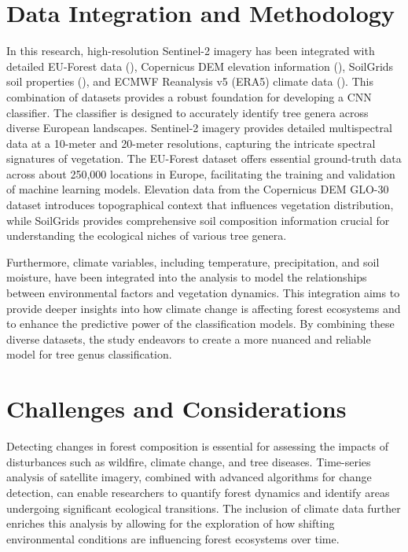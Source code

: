 \section{Data Integration and Methodology}

In this research, high-resolution Sentinel-2 imagery has been integrated with detailed EU-Forest data (\cite{eu_forest_data}), Copernicus DEM elevation information (\cite{dem_dataset}), SoilGrids soil properties (\cite{soil_report}), and ECMWF Reanalysis v5 (ERA5) climate data (\cite{era5_dataset}). This combination of datasets provides a robust foundation for developing a CNN classifier. The classifier is designed to accurately identify tree genera across diverse European landscapes. Sentinel-2 imagery provides detailed multispectral data at a 10-meter and 20-meter resolutions, capturing the intricate spectral signatures of vegetation. The EU-Forest dataset offers essential ground-truth data across about 250,000 locations in Europe, facilitating the training and validation of machine learning models. Elevation data from the Copernicus DEM GLO-30 dataset introduces topographical context that influences vegetation distribution, while SoilGrids provides comprehensive soil composition information crucial for understanding the ecological niches of various tree genera.

Furthermore, climate variables, including temperature, precipitation, and soil moisture, have been integrated into the analysis to model the relationships between environmental factors and vegetation dynamics. This integration aims to provide deeper insights into how climate change is affecting forest ecosystems and to enhance the predictive power of the classification models. By combining these diverse datasets, the study endeavors to create a more nuanced and reliable model for tree genus classification.

\section{Challenges and Considerations}

Detecting changes in forest composition is essential for assessing the impacts of disturbances such as wildfire, climate change, and tree diseases. Time-series analysis of satellite imagery, combined with advanced algorithms for change detection, can enable researchers to quantify forest dynamics and identify areas undergoing significant ecological transitions. The inclusion of climate data further enriches this analysis by allowing for the exploration of how shifting environmental conditions are influencing forest ecosystems over time.

